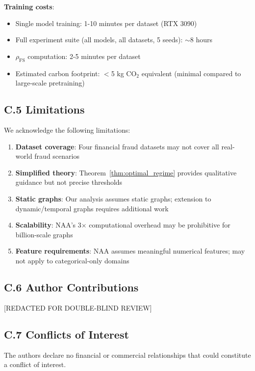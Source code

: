 \textbf{Training costs}:
\begin{itemize}
\item Single model training: 1-10 minutes per dataset (RTX 3090)
\item Full experiment suite (all models, all datasets, 5 seeds): $\sim$8 hours
\item $\rho_{\text{FS}}$ computation: 2-5 minutes per dataset
\item Estimated carbon footprint: $<$5 kg CO$_2$ equivalent (minimal compared to large-scale pretraining)
\end{itemize}

\subsection*{C.5 Limitations}

We acknowledge the following limitations:

\begin{enumerate}
\item \textbf{Dataset coverage}: Four financial fraud datasets may not cover all real-world fraud scenarios
\item \textbf{Simplified theory}: Theorem~\ref{thm:optimal_regime} provides qualitative guidance but not precise thresholds
\item \textbf{Static graphs}: Our analysis assumes static graphs; extension to dynamic/temporal graphs requires additional work
\item \textbf{Scalability}: NAA's 3$\times$ computational overhead may be prohibitive for billion-scale graphs
\item \textbf{Feature requirements}: NAA assumes meaningful numerical features; may not apply to categorical-only domains
\end{enumerate}

\subsection*{C.6 Author Contributions}

[REDACTED FOR DOUBLE-BLIND REVIEW]

\subsection*{C.7 Conflicts of Interest}

The authors declare no financial or commercial relationships that could constitute a conflict of interest.
